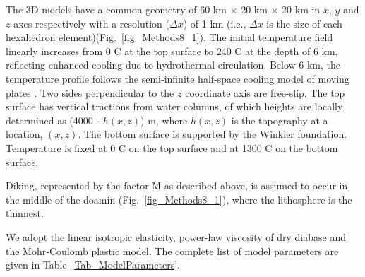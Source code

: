 The 3D models have a common geometry of 60 km $\times$ 20 km $\times$ 20 km in $x$, $y$ and $z$ axes respectively with a resolution ($\Delta x$) of 1 km (i.e., $\Delta x$ is the size of each hexahedron element)(Fig.~\ref{fig_Methods8_1}). %
The initial temperature field linearly increases from 0 \degree C at the top surface to 240 \degree C at the depth of 6 km, reflecting enhanced cooling due to hydrothermal circulation. Below 6 km, the temperature profile follows the semi-infinite half-space cooling model of moving plates \citep[e.g.,][]{Turcotte2002}. Two sides perpendicular to the $z$ coordinate axis are free-slip. The top surface has vertical tractions from water columns, of which heights are locally determined as (4000 - $h(x,z)$) m, where $h(x,z)$ is the topography at a location, $(x,z)$. The bottom surface is supported by the Winkler foundation. Temperature is fixed at 0 \degree C on the top surface and at 1300 \degree C on the bottom surface. 

Diking, represented by the factor M as described above, is assumed to occur in the middle of the doamin (Fig.~\ref{fig_Methods8_1}), where the lithosphere is the thinnest.

We adopt the linear isotropic elasticity, power-law viscosity of dry diabase \citep[e.g.,][]{Kirby1987, Buck2005} and the Mohr-Coulomb plastic model. The complete list of model parameters are given in Table~\hyperref[Tab_ModelParameters]{\ref{Tab_ModelParameters}}.

